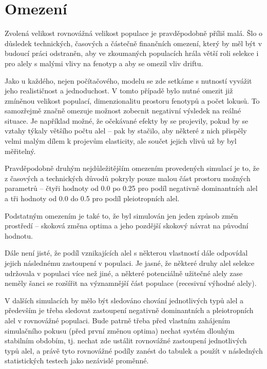 \section{Omezení}

Zvolená velikost rovnovážná velikost populace je pravděpodobně příliš malá. Šlo o důsledek technických, časových a
částečně finančních omezení, který by měl být v budoucí práci odstraněn, aby ve zkoumaných populacích hrála
větší roli selekce i pro alely s malými vlivy na fenotyp a aby se omezil vliv driftu.

Jako u každého, nejen počítačového, modelu se zde setkáme s nutností vyvážit jeho realističnost a jednoduchost. V
tomto případě bylo nutné omezit již zmíněnou velikost populací, dimenzionalitu prostoru fenotypů a počet lokusů.
To samozřejmě značně omezuje možnost zobecnit negativní výsledek na reálné situace. Je například možné, že očekávané
efekty by se projevily, pokud by se vztahy týkaly většího počtu alel -- pak by stačilo, aby některé z nich přispěly
velmi malým dílem k projevům elasticity, ale součet jejich vlivů už by byl měřitelný.

Pravděpodobně druhým nejdůležitějším omezením provedených simulací je to, že z časových a technických důvodů
pokryly pouze malou část prostoru možných parametrů -- čtyři hodnoty od 0.0 po 0.25 pro podíl negativně dominantních
alel a tři hodnoty od 0.0 do 0.5 pro podíl pleiotropních alel.

Podstatným omezením je také to, že byl simulován jen jeden způsob změn prostředí -- skoková změna optima a jeho
pozdější skokový návrat na původní hodnotu.

Dále není jisté, že podíl vznikajících alel s některou vlastností dále odpovídal jejich následnému zastoupení v
populaci. Je jasné, že některé druhy alel selekce udržovala v populaci více než jiné, a některé potenciálně užitečné
alely zase neměly šanci se rozšířit na významnější část populace (recesivní výhodné alely).

V dalších simulacích by mělo být sledováno chování jednotlivých typů alel a především je třeba sledovat zastoupení
negativně dominantních a pleiotropních alel v rovnovážné populaci.
Bude patrně třeba před vlastním zahájením simulačního pokusu (před první změnou  optima) nechat systém 
dlouhým stabilním obdobím, tj. nechat zde ustálit rovnovážné zastoupení jednotlivých typů alel,
a právě tyto rovnovážné podíly zanést do tabulek a použít v následných statistických testech jako nezávislé proměnné.

\vspace*{1em}

